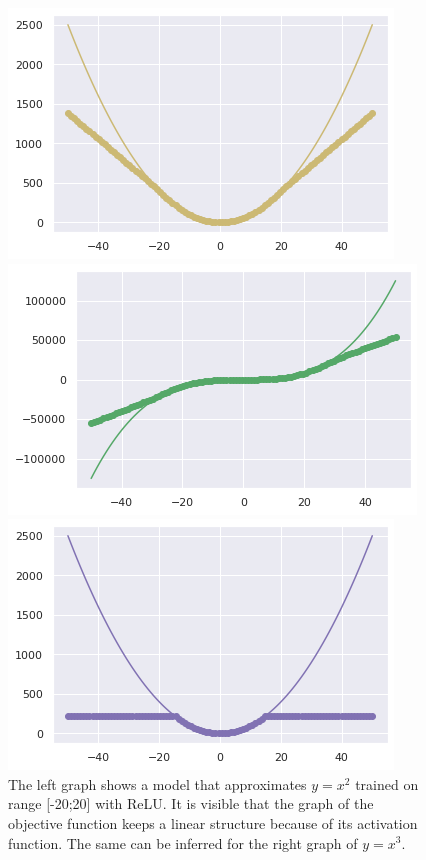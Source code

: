 \documentclass{article}
\begin{document}
\begin{figure}[h!]
\begin{multicols}{2}
    \includegraphics[width=\linewidth]{ReLUx2.png}\par 
    \includegraphics[width=\linewidth]{ReLUx3.png}\par 
\end{multicols}
\caption{The left graph shows a model that approximates $y = x^2$ trained on range [-20;20] with ReLU. It is visible that the graph of the objective function keeps a linear structure because of its activation function. The same can be inferred for the right graph of $y=x^3$. }
\begin{multicols}{2}
    \includegraphics[width=\linewidth]{Tanhx2.png}\par

\end{multicols}
\end{figure}
\end{document}

